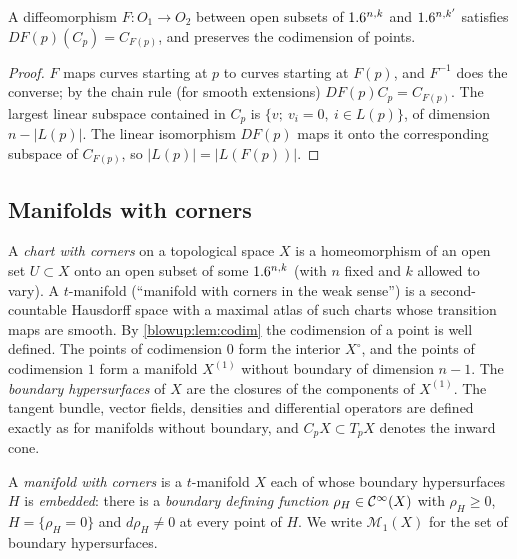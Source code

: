 \begin{lemma}\label{blowup:lem:codim}
A diffeomorphism $F:O_1\to O_2$ between open subsets of $1.6^{n,k}$ and $1.6^{n,k'}$
satisfies $DF(p)(C_p)=C_{F(p)}$, and preserves the codimension of points.
\end{lemma}
\begin{proof}
$F$ maps curves starting at $p$ to curves starting at $F(p)$, and $F^{-1}$ does the
converse; by the chain rule (for smooth extensions) $DF(p)C_p=C_{F(p)}$. The largest
linear subspace contained in $C_p$ is $\{v;\ v_i=0,\ i\in L(p)\}$, of dimension
$n-|L(p)|$. The linear isomorphism $DF(p)$ maps it onto the corresponding subspace of
$C_{F(p)}$, so $|L(p)|=|L(F(p))|$.
\end{proof}

\subsection{Manifolds with corners}
A \emph{chart with corners} on a topological space $X$ is a homeomorphism of an open
set $U\subset X$ onto an open subset of some $1.6^{n,k}$ (with $n$ fixed and $k$ allowed
to vary). A $t$-manifold (``manifold with corners in the weak sense'') is a
second-countable Hausdorff space with a maximal atlas of such charts whose transition
maps are smooth. By \cref{blowup:lem:codim} the codimension of a point is well
defined. The points of codimension $0$ form the interior $X^\circ$, and the points of
codimension $1$ form a manifold $X^{(1)}$ without boundary of dimension $n-1$. The
\emph{boundary hypersurfaces} of $X$ are the closures of the components of $X^{(1)}$.
The tangent bundle, vector fields, densities and differential operators are defined
exactly as for manifolds without boundary, and $C_pX\subset T_pX$ denotes the inward
cone.

\begin{definition}\label{blowup:def:mwc}
A \emph{manifold with corners} is a $t$-manifold $X$ each of whose boundary
hypersurfaces $H$ is \emph{embedded}: there is a \emph{boundary defining function}
$\rho_H\in\mathcal{C}^\infty(X)$ with $\rho_H\ge0$, $H=\{\rho_H=0\}$ and $d\rho_H\ne0$ at every point
of $H$. We write $\mathcal M_1(X)$ for the set of boundary hypersurfaces.
\end{definition}

